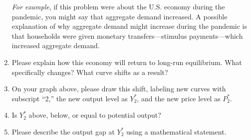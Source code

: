 \documentclass{assignment}
\begin{document}
\begin{enumerate}
\emph{For example}, if this problem were about the U.S. economy during the pandemic, you might say that aggregate demand increased. A possible explanation of why aggregate demand might increase during the pandemic is that households were given monetary transfers---stimulus payments---which increased aggregate demand.

\vfill

\item Please explain how this economy will return to long-run equilibrium. What specifically changes? What curve shifts as a result?

\vspace{4.0\baselineskip}

\item On your graph above, please draw this shift, labeling new curves with subscript ``2,'' the new output level as $Y^*_2$, and the new price level as $P^*_2$.

\item Is $Y^*_2$ above, below, or equal to potential output?

\vspace{3.0\baselineskip}

\item Please describe the output gap at $Y^*_2$ using a mathematical statement.

\vspace{2.0\baselineskip}

\end{enumerate}
\end{document}
